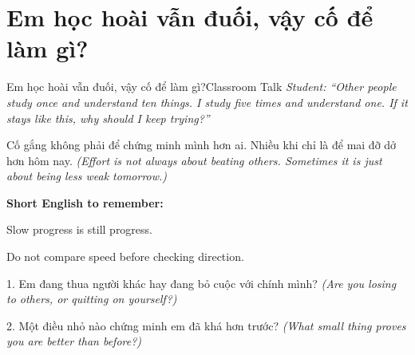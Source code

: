 \section{Em học hoài vẫn đuối, vậy cố để làm gì?}
\begin{truyen}{Em học hoài vẫn đuối, vậy cố để làm gì?}{Classroom Talk}
\textit{Student: ``Other people study once and understand ten things. I study five times and understand one. If it stays like this, why should I keep trying?''}\\[4pt]



\end{truyen}

\begin{baihoc}
Cố gắng không phải để chứng minh mình hơn ai. Nhiều khi chỉ là để mai đỡ dở hơn hôm nay.
\textit{(Effort is not always about beating others. Sometimes it is just about being less weak tomorrow.)}
\end{baihoc}

\begin{ghinhoanh}
\textbf{Short English to remember:}

Slow progress is still progress.

Do not compare speed before checking direction.
\end{ghinhoanh}

\begin{tuhocnhanh}
1. Em đang thua người khác hay đang bỏ cuộc với chính mình? \textit{(Are you losing to others, or quitting on yourself?)}

2. Một điều nhỏ nào chứng minh em đã khá hơn trước? \textit{(What small thing proves you are better than before?)}
\end{tuhocnhanh}
\ngancach

